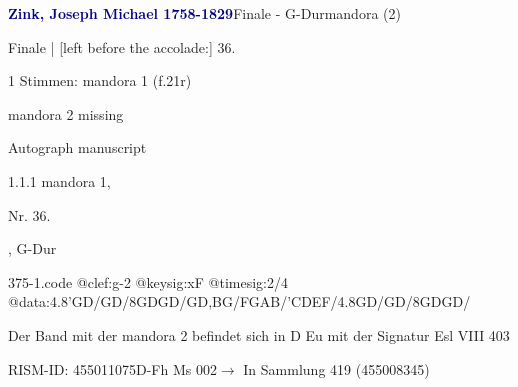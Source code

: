 \documentclass[twocolumn]{book}
\begin{document}
\par \vspace{7pt} \textcolor{darkblue}{\textbf{Zink, Joseph Michael  1758-1829}}\hfillplus{\textbf{[375]}}\newline Finale - G-Dur\newline mandora (2)
\par \begin{itshape}[f.21r, at left:] Finale | [left before the accolade:] 36.\end{itshape} 
\par \textcolor{darkblue}{}  1 Stimmen: mandora 1  (f.21r)\newline \begin{small} mandora 2 missing\end{small} \newline Autograph manuscript
\par 1.1.1  mandora 1, \begin{itshape}Nr. 36.\end{itshape}, G-Dur  
\begin{filecontents*}{375-1.code}
@clef:g-2
@keysig:xF
@timesig:2/4
@data:4.8'GD/GD/8GDGD/GD,BG/FGAB/'CDEF/4.8GD/GD/8GDGD/
\end{filecontents*}
\newline
%
\par Der Band mit der mandora 2 befindet sich in D Eu mit der Signatur Esl VIII 403
\par RISM-ID: 455011075\newline D-Fh  Ms 002\newline $\rightarrow$ In Sammlung 419 (455008345)
      
\end{document}
